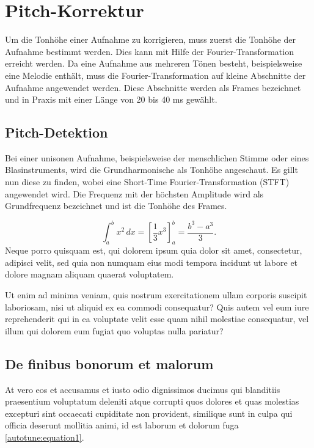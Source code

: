 %
%
%
%
\section{Pitch-Korrektur
\label{autotune:section:pitchKorrektur}}
Um die Tonhöhe einer Aufnahme zu korrigieren, muss zuerst die Tonhöhe der Aufnahme bestimmt werden.
Dies kann mit Hilfe der Fourier-Transformation erreicht werden.
Da eine Aufnahme aus mehreren Tönen besteht, beispielsweise eine Melodie enthält, muss die Fourier-Transformation auf kleine Abschnitte der Aufnahme angewendet werden.
Diese Abschnitte werden als Frames bezeichnet und in Praxis mit einer Länge von 20 bis 40 ms gewählt.

\subsection{Pitch-Detektion
\label{autotune:subsection:picthDetektion}}
Bei einer unisonen Aufnahme, beispielsweise der menschlichen Stimme oder eines Blasinstruments, wird die Grundharmonische als Tonhöhe angeschaut.
Es gillt nun diese zu finden, wobei eine Short-Time Fourier-Transformation (STFT) angewendet wird.
Die Frequenz mit der höchsten Amplitude wird als Grundfrequenz bezeichnet und ist die Tonhöhe des Frames.


\begin{equation}
\int_a^b x^2\, dx
=
\left[ \frac13 x^3 \right]_a^b
=
\frac{b^3-a^3}3.
\label{autotune:equation1}
\end{equation}
Neque porro quisquam est, qui dolorem ipsum quia dolor sit amet,
consectetur, adipisci velit, sed quia non numquam eius modi tempora
incidunt ut labore et dolore magnam aliquam quaerat voluptatem.

Ut enim ad minima veniam, quis nostrum exercitationem ullam corporis
suscipit laboriosam, nisi ut aliquid ex ea commodi consequatur?
Quis autem vel eum iure reprehenderit qui in ea voluptate velit
esse quam nihil molestiae consequatur, vel illum qui dolorem eum
fugiat quo voluptas nulla pariatur?

\subsection{De finibus bonorum et malorum
\label{autotune:subsection:finibus}}
At vero eos et accusamus et iusto odio dignissimos ducimus qui
blanditiis praesentium voluptatum deleniti atque corrupti quos
dolores et quas molestias excepturi sint occaecati cupiditate non
provident, similique sunt in culpa qui officia deserunt mollitia
animi, id est laborum et dolorum fuga \eqref{autotune:equation1}.

